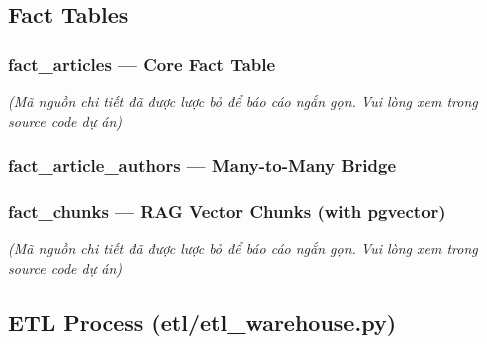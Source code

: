 \hypertarget{fact-tables}{%
\subsection{Fact Tables}}

\hypertarget{fact_articles-core-fact-table}{%
\subsubsection{fact\_articles --- Core Fact
Table}}

\emph{(Mã nguồn chi tiết đã được lược bỏ để báo cáo ngắn gọn. Vui lòng
xem trong source code dự án)}

\hypertarget{fact_article_authors-many-to-many-bridge}{%
\subsubsection{fact\_article\_authors --- Many-to-Many
Bridge}}

\begin{Shaded}
\begin{Highlighting}[]
 
  
   
  \NormalTok{,           }
     
\NormalTok{);}
\end{Highlighting}
\end{Shaded}

\hypertarget{fact_chunks-rag-vector-chunks-with-pgvector}{%
\subsubsection{fact\_chunks --- RAG Vector Chunks (with
pgvector)}}

\emph{(Mã nguồn chi tiết đã được lược bỏ để báo cáo ngắn gọn. Vui lòng
xem trong source code dự án)}

\hypertarget{etl-process-etletl_warehouse.py}{%
\subsection{ETL Process
(etl/etl\_warehouse.py)}}

